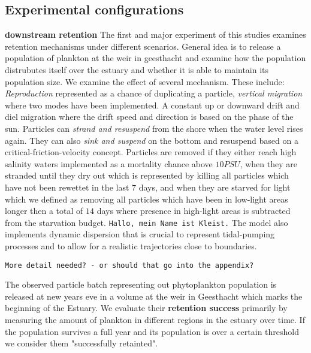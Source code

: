 \subsection*{Experimental configurations}



\textbf{downstream retention}
The first and major experiment of this studies examines retention mechanisms under different scenarios.
General idea is to release a population of plankton at the weir in geesthacht and examine how the population distrubutes itself over the estuary and whether it is able to maintain its population size.
We examine the effect of several mechanism. These include:
\textit{Reproduction} represented as a chance of duplicating a particle,
\textit{vertical migration} where two modes have been implemented. A constant up or downward drift and diel migration where the drift speed and direction is based on the phase of the sun.
Particles can \textit{strand and resuspend} from the shore when the water level rises again.
They can also \textit{sink and suspend} on the bottom and resuspend based on a critical-friction-velocity concept.
Particles are removed if they either reach high salinity waters implemented as a mortality chance above $10 PSU$,
when they are stranded until they dry out which is represented by killing all particles which have not been rewettet in the last $7$ days,
and when they are starved for light which we defined as removing all particles which have been in low-light areas longer then a total of $14$ days where presence in high-light areas is subtracted from the starvation budget.
\texttt{Hallo, mein Name ist Kleist.}
The model also implements dynamic dispersion that is crucial to represent tidal-pumping processes and to allow for a realistic trajectories close to boundaries.

\smallskip
\texttt{More detail needed? - or should that go into the appendix?}
\smallskip

The observed particle batch representing out phytoplankton population is released at new years eve in a volume at the weir in Geesthacht which marks the beginning of the Estuary.
We evaluate their \textbf{retention success} primarily by measuring the amount of plankton in different regions in the estuary over time.
If the population survives a full year and its population is over a certain threshold we consider them "successfully retainted".

